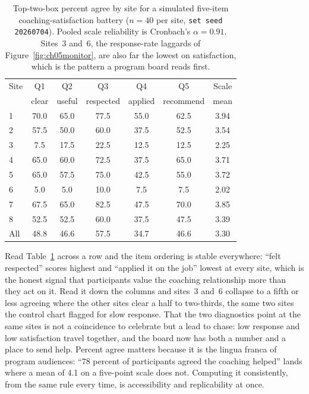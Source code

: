\documentclass[
    a4paper,
    fontsize=10pt,
    twoside=true,
    numbers=noenddot,
]{kaobook}
\begin{document}
\begin{table}[htbp]
\centering
\caption[Percent agree by site, simulated coaching battery]{Top-two-box percent agree by site for a simulated five-item coaching-satisfaction battery ($n=40$ per site, \texttt{set seed 20260704}). Pooled scale reliability is Cronbach's $\alpha=0.91$. Sites~3 and~6, the response-rate laggards of Figure~\ref{fig:ch05monitor}, are also far the lowest on satisfaction, which is the pattern a program board reads first.}
\label{tab:ch05agree}
{\footnotesize
\begin{tabular}{lcccccc}
\hline
Site & Q1 & Q2 & Q3 & Q4 & Q5 & Scale \\
     & clear & useful & respected & applied & recommend & mean \\
\hline
1 & 70.0 & 65.0 & 77.5 & 55.0 & 62.5 & 3.94 \\
2 & 57.5 & 50.0 & 60.0 & 37.5 & 52.5 & 3.54 \\
3 &  7.5 & 17.5 & 22.5 & 12.5 & 12.5 & 2.25 \\
4 & 65.0 & 60.0 & 72.5 & 37.5 & 65.0 & 3.71 \\
5 & 65.0 & 57.5 & 75.0 & 42.5 & 55.0 & 3.72 \\
6 &  5.0 &  5.0 & 10.0 &  7.5 &  7.5 & 2.02 \\
7 & 67.5 & 65.0 & 82.5 & 47.5 & 70.0 & 3.85 \\
8 & 52.5 & 52.5 & 60.0 & 37.5 & 47.5 & 3.39 \\
\hline
All & 48.8 & 46.6 & 57.5 & 34.7 & 46.6 & 3.30 \\
\hline
\end{tabular}
}
\end{table}

Read Table~\ref{tab:ch05agree} across a row and the item ordering is stable everywhere: \enquote{felt respected} scores highest and \enquote{applied it on the job} lowest at every site, which is the honest signal that participants value the coaching relationship more than they act on it. Read it down the columns and sites~3 and~6 collapse to a fifth or less agreeing where the other sites clear a half to two-thirds, the same two sites the control chart flagged for slow response. That the two diagnostics point at the same sites is not a coincidence to celebrate but a lead to chase: low response and low satisfaction travel together, and the board now has both a number and a place to send help. Percent agree matters because it is the lingua franca of program audiences: \enquote{78 percent of participants agreed the coaching helped} lands where a mean of 4.1 on a five-point scale does not. Computing it consistently, from the same rule every time, is accessibility and replicability at once.
\end{document}
